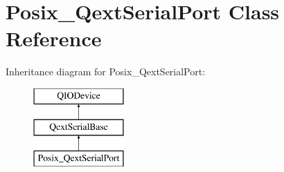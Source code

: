 \hypertarget{class_posix___qext_serial_port}{}\section{Posix\+\_\+\+Qext\+Serial\+Port Class Reference}
\label{class_posix___qext_serial_port}
Inheritance diagram for Posix\+\_\+\+Qext\+Serial\+Port\+:\begin{figure}[H]
\begin{center}
\leavevmode
\includegraphics[height=3.000000cm]{class_posix___qext_serial_port}
\end{center}
\end{figure}
